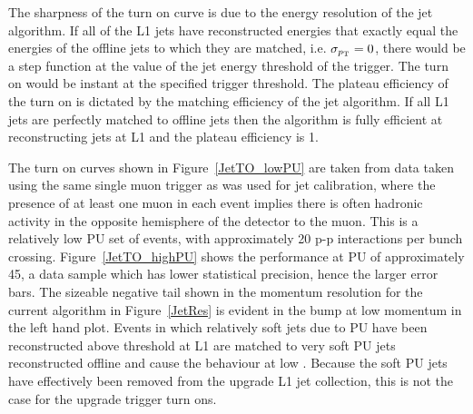 The sharpness of the turn on curve is due to the energy resolution of the jet algorithm.
If all of the \ac{L1} jets have reconstructed energies that exactly equal the energies of the offline jets to which they are matched,
i.e. $\sigma_{p_{\text{T}}} = 0$, there would be a step function at the value of the jet energy threshold of the trigger.
The turn on would be instant at the specified trigger threshold.
%
The plateau efficiency of the turn on is dictated by the matching efficiency of the jet algorithm.
If all \ac{L1} jets are perfectly matched to offline jets then the algorithm is fully efficient at reconstructing jets at \ac{L1} and the plateau efficiency is 1.

The turn on curves shown in Figure~\ref{JetTO_lowPU} are taken from data taken using the same single muon trigger as was used for jet calibration, where the presence of at least one muon in each event implies there is often hadronic activity in the opposite hemisphere of the detector to the muon. 
This is a relatively low \ac{PU} set of events, with approximately 20 p-p interactions per bunch crossing. 
Figure~\ref{JetTO_highPU} shows the performance at \ac{PU} of approximately 45, a data sample which has lower statistical precision, hence the larger error bars.
The sizeable negative tail shown in the momentum resolution for the current algorithm in Figure~\ref{JetRes} is 
evident in the bump at low momentum in the left hand plot.
Events in which relatively soft jets due to \ac{PU} have been reconstructed above threshold at \ac{L1} are 
matched to very soft \ac{PU} jets reconstructed offline and cause the behaviour at low \pt.
Because the soft \ac{PU} jets have effectively been removed from the upgrade \ac{L1} jet collection, this is not the case for the upgrade trigger turn ons.


